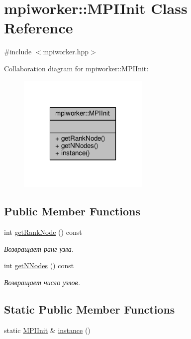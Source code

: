 \hypertarget{classmpiworker_1_1MPIInit}{\section{mpiworker\-:\-:M\-P\-I\-Init Class Reference}
\label{classmpiworker_1_1MPIInit}
}


{\ttfamily \#include $<$mpiworker.\-hpp$>$}



Collaboration diagram for mpiworker\-:\-:M\-P\-I\-Init\-:\nopagebreak
\begin{figure}[H]
\begin{center}
\leavevmode
\includegraphics[width=178pt]{classmpiworker_1_1MPIInit__coll__graph}
\end{center}
\end{figure}
\subsection*{Public Member Functions}
\begin{DoxyCompactItemize}
\item 
int \hyperlink{classmpiworker_1_1MPIInit_a9b44428732f6317268da287d1844d1c9}{get\-Rank\-Node} () const 
\begin{DoxyCompactList}\small\item\em Возвращает ранг узла. \end{DoxyCompactList}\item 
int \hyperlink{classmpiworker_1_1MPIInit_a7b8323075afa7a6d36015e66286183fc}{get\-N\-Nodes} () const 
\begin{DoxyCompactList}\small\item\em Возвращает число узлов. \end{DoxyCompactList}\end{DoxyCompactItemize}
\subsection*{Static Public Member Functions}
\begin{DoxyCompactItemize}
\item 
static \hyperlink{classmpiworker_1_1MPIInit}{M\-P\-I\-Init} \& \hyperlink{classmpiworker_1_1MPIInit_a20d2436672af2589cb72200396a8aed6}{instance} ()
\end{DoxyCompactItemize}



